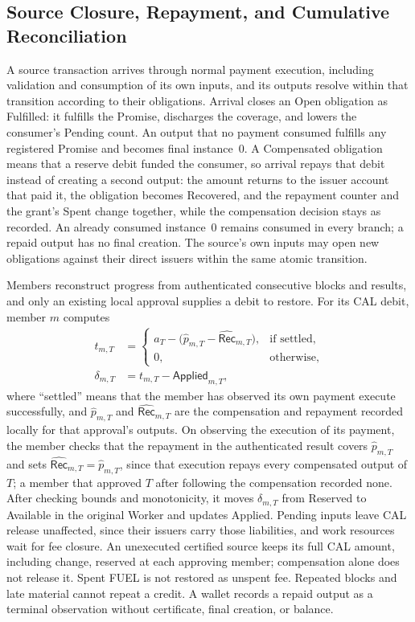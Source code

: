 \subsection{Source Closure, Repayment, and Cumulative Reconciliation}
\label{sec:protocol-closure}

A source transaction arrives through normal payment execution, including validation and consumption of its own inputs, and its outputs resolve within that transition according to their obligations. Arrival closes an Open obligation as Fulfilled: it fulfills the Promise, discharges the coverage, and lowers the consumer's Pending count. An output that no payment consumed fulfills any registered Promise and becomes final instance~0. A Compensated obligation means that a reserve debit funded the consumer, so arrival repays that debit instead of creating a second output: the amount returns to the issuer account that paid it, the obligation becomes Recovered, and the repayment counter and the grant's Spent change together, while the compensation decision stays as recorded. An already consumed instance~0 remains consumed in every branch; a repaid output has no final creation. The source's own inputs may open new obligations against their direct issuers within the same atomic transition.

Members reconstruct progress from authenticated consecutive blocks and results, and only an existing local approval supplies a debit to restore. For its CAL debit, member $m$ computes
\begin{equation}
  \begin{aligned}
    t_{m,T}&=
    \begin{cases}
      a_T-\bigl(\widehat{p}_{m,T}-\widehat{\mathsf{Rec}}_{m,T}\bigr),
        &\text{if settled},\\
      0,&\text{otherwise},
    \end{cases}\\
    \delta_{m,T}&=t_{m,T}-\mathsf{Applied}_{m,T},
  \end{aligned}
  \label{eq:protocol-release}
\end{equation}
where ``settled'' means that the member has observed its own payment execute successfully, and $\widehat{p}_{m,T}$ and $\widehat{\mathsf{Rec}}_{m,T}$ are the compensation and repayment recorded locally for that approval's outputs. On observing the execution of its payment, the member checks that the repayment in the authenticated result covers $\widehat{p}_{m,T}$ and sets $\widehat{\mathsf{Rec}}_{m,T}=\widehat{p}_{m,T}$, since that execution repays every compensated output of $T$; a member that approved $T$ after following the compensation recorded none. After checking bounds and monotonicity, it moves $\delta_{m,T}$ from Reserved to Available in the original Worker and updates Applied. Pending inputs leave CAL release unaffected, since their issuers carry those liabilities, and work resources wait for fee closure. An unexecuted certified source keeps its full CAL amount, including change, reserved at each approving member; compensation alone does not release it. Spent FUEL is not restored as unspent fee. Repeated blocks and late material cannot repeat a credit. A wallet records a repaid output as a terminal observation without certificate, final creation, or balance.

